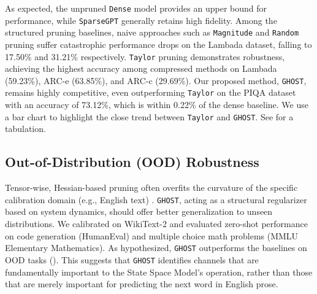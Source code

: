 \documentclass{article}
\theoremstyle{plain}
\theoremstyle{definition}
\theoremstyle{remark}
\begin{document}
As expected, the unpruned \texttt{Dense} model provides an upper bound for performance, while \texttt{SparseGPT} generally retains high fidelity. Among the structured pruning baselines, naive approaches such as \texttt{Magnitude} and \texttt{Random} pruning suffer catastrophic performance drops on the Lambada dataset, falling to 17.50\% and 31.21\% respectively. \texttt{Taylor} pruning demonstrates robustness, achieving the highest accuracy among compressed methods on Lambada (59.23\%), ARC-e (63.85\%), and ARC-c (29.69\%). Our proposed method, \texttt{GHOST}, remains highly competitive, even outperforming \texttt{Taylor} on the PIQA dataset with an accuracy of 73.12\%, which is within 0.22\% of the dense baseline. We use a bar chart to highlight the close trend between \texttt{Taylor} and \texttt{GHOST}. See   for a tabulation.



\subsection{Out-of-Distribution (OOD) Robustness}
\label{subsec:ood_robustness}

Tensor-wise, Hessian-based pruning often overfits the curvature of the specific calibration domain (e.g., English text) \citep{tang2025gaprunegradientalignmentpruningdomainaware}. \texttt{GHOST}, acting as a structural regularizer based on system dynamics, should offer better generalization to unseen distributions. We calibrated on WikiText-2 and evaluated zero-shot performance on code generation (HumanEval) and multiple choice math problems (MMLU Elementary Mathematics). As hypothesized, \texttt{GHOST} outperforms the baselines on OOD tasks (). This suggests that \texttt{GHOST} identifies channels that are fundamentally important to the State Space Model's operation, rather than those that are merely important for predicting the next word in English prose.
\end{document}
